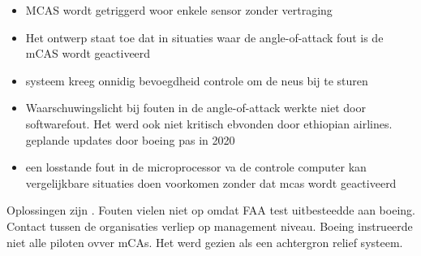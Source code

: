 \documentclass{article}
\begin{document}
	\begin{itemize}
		\item MCAS wordt getriggerd woor enkele sensor zonder vertraging
		\item Het ontwerp staat toe dat  in situaties waar de angle-of-attack fout is de mCAS wordt geactiveerd
		\item systeem kreeg onnidig bevoegdheid controle om de neus bij te sturen
		\item  Waarschuwingslicht bij fouten in de angle-of-attack werkte niet door  softwarefout. Het werd ook niet kritisch ebvonden door ethiopian airlines. geplande updates door boeing pas in 2020
		\item een losstande fout in de microprocessor va de controle computer kan vergelijkbare situaties doen voorkomen zonder dat mcas wordt geactiveerd
	\end{itemize}
	Oplossingen zijn \cite{caa737modifications}. 
	Fouten vielen niet op omdat FAA test uitbesteedde aan boeing. Contact tussen de organisaties verliep op management niveau. Boeing instrueerde niet alle piloten ovver mCAs. Het werd gezien als een achtergron relief systeem.
\end{document}
